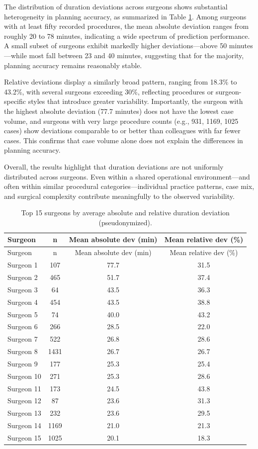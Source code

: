 \documentclass[
]{article}
\begin{document}
The distribution of duration deviations across surgeons shows
substantial heterogeneity in planning accuracy, as summarized in Table
\ref{tab:surgeon_deviation}. Among surgeons with at least fifty recorded
procedures, the mean absolute deviation ranges from roughly 20 to 78
minutes, indicating a wide spectrum of prediction performance. A small
subset of surgeons exhibit markedly higher deviations---above 50
minutes---while most fall between 23 and 40 minutes, suggesting that for
the majority, planning accuracy remains reasonably stable.

Relative deviations display a similarly broad pattern, ranging from
18.3\% to 43.2\%, with several surgeons exceeding 30\%, reflecting
procedures or surgeon-specific styles that introduce greater
variability. Importantly, the surgeon with the highest absolute
deviation (77.7 minutes) does not have the lowest case volume, and
surgeons with very large procedure counts (e.g., 931, 1169, 1025 cases)
show deviations comparable to or better than colleagues with far fewer
cases. This confirms that case volume alone does not explain the
differences in planning accuracy.

Overall, the results highlight that duration deviations are not
uniformly distributed across surgeons. Even within a shared operational
environment---and often within similar procedural
categories---individual practice patterns, case mix, and surgical
complexity contribute meaningfully to the observed variability.

\begin{longtable}[]{@{}lccc@{}}
\caption{Top 15 surgeons by average absolute and relative duration
deviation (pseudonymized). \label{tab:surgeon_deviation}}\tabularnewline
\toprule\noalign{}
Surgeon & n & Mean absolute dev (min) & Mean relative dev (\%) \\
\midrule\noalign{}
\endfirsthead
\toprule\noalign{}
Surgeon & n & Mean absolute dev (min) & Mean relative dev (\%) \\
\midrule\noalign{}
\endhead
\bottomrule\noalign{}
\endlastfoot
Surgeon 1 & 107 & 77.7 & 31.5 \\
Surgeon 2 & 465 & 51.7 & 37.4 \\
Surgeon 3 & 64 & 43.5 & 36.3 \\
Surgeon 4 & 454 & 43.5 & 38.8 \\
Surgeon 5 & 74 & 40.0 & 43.2 \\
Surgeon 6 & 266 & 28.5 & 22.0 \\
Surgeon 7 & 522 & 26.8 & 28.6 \\
Surgeon 8 & 1431 & 26.7 & 26.7 \\
Surgeon 9 & 177 & 25.3 & 25.4 \\
Surgeon 10 & 271 & 25.3 & 28.6 \\
Surgeon 11 & 173 & 24.5 & 43.8 \\
Surgeon 12 & 87 & 23.6 & 31.3 \\
Surgeon 13 & 232 & 23.6 & 29.5 \\
Surgeon 14 & 1169 & 21.0 & 21.3 \\
Surgeon 15 & 1025 & 20.1 & 18.3 \\
\end{longtable}
\end{document}

